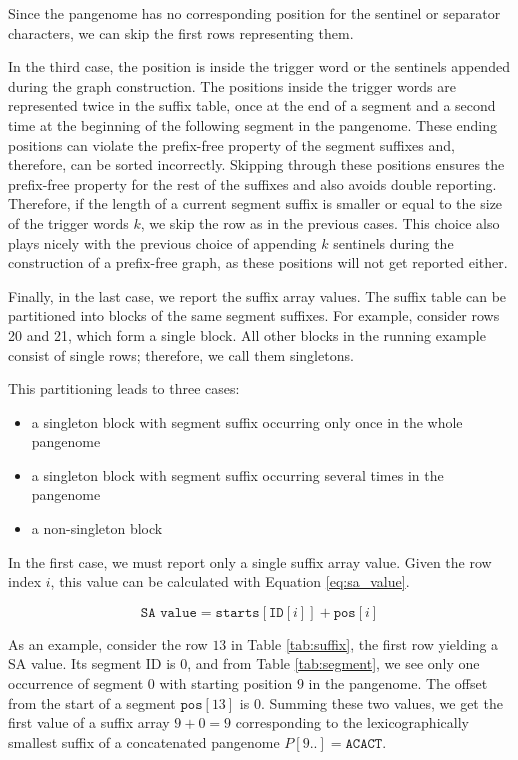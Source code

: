 Since the pangenome has no corresponding position for the sentinel or separator characters, we can skip the first rows representing them.

In the third case, the position is inside the trigger word or the sentinels appended during the graph construction.
The positions inside the trigger words are represented twice in the suffix table, once at the end of a segment and a second time at the beginning of the following segment in the pangenome.
These ending positions can violate the prefix-free property of the segment suffixes and, therefore, can be sorted incorrectly.
Skipping through these positions ensures the prefix-free property for the rest of the suffixes and also avoids double reporting.
Therefore, if the length of a current segment suffix is smaller or equal to the size of the trigger words $k$, we skip the row as in the previous cases.
This choice also plays nicely with the previous choice of appending $k$ sentinels during the construction of a prefix-free graph, as these positions will not get reported either.

Finally, in the last case, we report the suffix array values.
The suffix table can be partitioned into blocks of the same segment suffixes.
For example, consider rows 20 and 21, which form a single block.
All other blocks in the running example consist of single rows; therefore, we call them singletons.

This partitioning leads to three cases:
\begin{itemize}
    \item a singleton block with segment suffix occurring only once in the whole pangenome
    \item a singleton block with segment suffix occurring several times in the pangenome
    \item a non-singleton block
\end{itemize}

In the first case, we must report only a single suffix array value.
Given the row index $i$, this value can be calculated with Equation \ref{eq:sa_value}.

\begin{equation}
    \label{eq:sa_value}
    \texttt{SA value} = \texttt{starts}[\texttt{ID}[i]] + \texttt{pos}[i]
\end{equation}

As an example, consider the row $13$ in Table \ref{tab:suffix}, the first row yielding a SA value.
Its segment ID is $0$, and from Table \ref{tab:segment}, we see only one occurrence of segment $0$ with starting position $9$ in the pangenome.
The offset from the start of a segment $\texttt{pos}[13]$ is $0$.
Summing these two values, we get the first value of a suffix array $9 + 0 = 9$ corresponding to the lexicographically smallest suffix of a concatenated pangenome $P[9..] = \texttt{ACACT}$.


